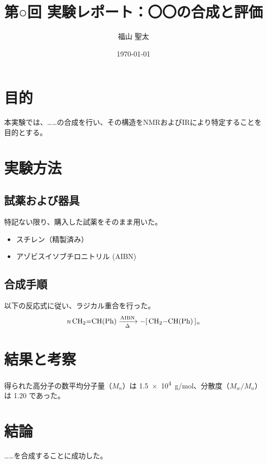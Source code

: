 \documentclass[uplatex, a4paper, 11pt]{jsarticle}
\title{第○回 実験レポート：〇〇の合成と評価}
\author{福山 聖太}
\date{\today}
\begin{document}
\maketitle

\section{目的}
本実験では、……の合成を行い、その構造をNMRおよびIRにより特定することを目的とする。

\section{実験方法}
\subsection{試薬および器具}
特記ない限り、購入した試薬をそのまま用いた。
\begin{itemize}
    \item スチレン（精製済み）
    \item アゾビスイソブチロニトリル (AIBN)
\end{itemize}

\subsection{合成手順}
以下の反応式に従い、ラジカル重合を行った。
\begin{equation}
    \ce{\mathit{n} CH2=CH(Ph) ->[AIBN][\Delta] -[ CH2-CH(Ph) ]_{\mathit{n}}}
\end{equation}

\section{結果と考察}
得られた高分子の数平均分子量（$M_n$）は \SI{1.5e4}{g/mol}、分散度（$M_w/M_n$）は \SI{1.20}{} であった。


\section{結論}
……を合成することに成功した。
\end{document}
